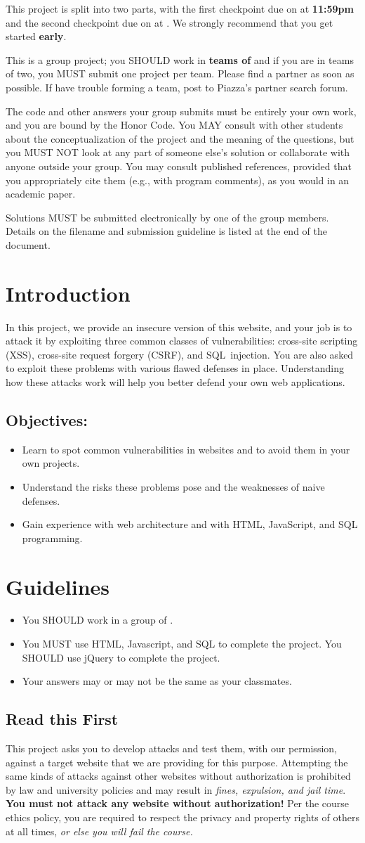 \documentclass[letterpaper,12pt]{report}
\newcommand{\htitle}
{
     \noindent\parbox{\textwidth}
    {
        \course\hfill \distdate\newline
        \coursename\hfill 
        \settitle \vspace*{-.5ex}\newline
        \mbox{}\hrulefill\mbox{}
    }
    \vspace{8pt}
    \begin{center}{\Large\bf{\settitle}}\end{center}
}
\newcommand{\handout}
{
    \thispagestyle{empty}
    \markboth{}{}
    \pagestyle{plain}
    \htitle
}
\newcommand{\problemsetheader}
{
\setlength{\parindent}{0pt}

This project is split into two parts, with the first checkpoint due on {\bf \checkpointduedate} at {\bf 11:59pm} and the second checkpoint due on {\bf \duedate} at {\bf \duetime}. We strongly recommend that you get started {\bf early}. 
\medskip

This is a group project; you SHOULD work in \textbf{teams of \numberingroup} and if you are in teams of two, you MUST submit one project per team.  Please find a partner as soon as possible.  If have trouble forming a team, post to Piazza's partner search forum.

\medskip

The code and other answers your group submits must be entirely your own work, and you are bound by the Honor Code.  You MAY consult with other students about the conceptualization of the project and the meaning of the questions, but you MUST NOT look at any part of someone else's solution or collaborate with anyone outside your group.  You may consult published references, provided that you appropriately cite them (e.g., with program comments), as you would in an academic paper.

\medskip

Solutions MUST be submitted electronically by one of the group members. Details on the filename and submission guideline is listed at the end of the document.

\medskip

\hrulefill

\medskip

}
\begin{document}
\handout
\problemsetheader


\vspace{-6pt}
\section*{Introduction}
In this project, we provide an insecure version of this website, and your job is to attack it by exploiting three common classes of vulnerabilities: cross-site scripting (XSS), cross-site request forgery (CSRF), and SQL~injection. You are also asked to exploit these problems with various flawed defenses in place. Understanding how these attacks work will help you better defend your own web applications.\newline

\subsection*{Objectives:}

\begin{itemize}
\item Learn to spot common vulnerabilities in websites and to avoid them in your own projects.
\item Understand the risks these problems pose and the weaknesses of naive defenses.
\item Gain experience with web architecture and with HTML, JavaScript, and SQL programming.
\end{itemize}

\section*{Guidelines}
\begin{itemize}
\item You SHOULD work in a group of \numberingroup.
\item You MUST use HTML, Javascript, and SQL to complete the project. You SHOULD use jQuery to complete the project.
\item Your answers may or may not be the same as your classmates.
\end{itemize}

\smallskip

\subsection*{Read this First}

This project asks you to develop attacks and test them, with our permission, against a target website that we are providing for this purpose.  Attempting the same kinds of attacks against other websites without authorization is prohibited by law and university policies and may result in \emph{fines, expulsion, and jail time}.   \textbf{You must not attack any website without authorization!}  Per the course ethics policy, you are required to respect the privacy and  property rights of others at all times, \emph{or else you will fail the course.}  
\end{document}
